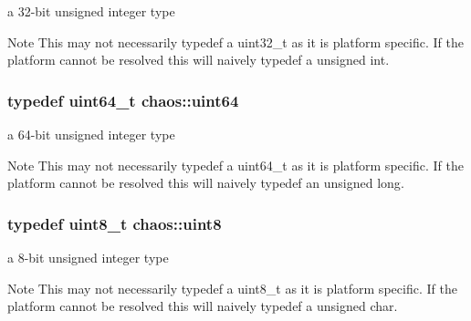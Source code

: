 a 32-\/bit unsigned integer type 

\begin{DoxyNote}{Note}
This may not necessarily {\ttfamily typedef} a {\ttfamily uint32\+\_\+t} as it is platform specific. If the platform cannot be resolved this will naively {\ttfamily typedef} a {\ttfamily unsigned int}. 
\end{DoxyNote}
\hypertarget{namespacechaos_a34fe5f5bfc3ef6d80b5d094ed91b4d6e}{}
\subsubsection[{uint64}]{\setlength{\rightskip}{0pt plus 5cm}typedef uint64\+\_\+t {\bf chaos\+::uint64}}\label{namespacechaos_a34fe5f5bfc3ef6d80b5d094ed91b4d6e}


a 64-\/bit unsigned integer type 

\begin{DoxyNote}{Note}
This may not necessarily {\ttfamily typedef} a {\ttfamily uint64\+\_\+t} as it is platform specific. If the platform cannot be resolved this will naively {\ttfamily typedef} an {\ttfamily unsigned long}. 
\end{DoxyNote}
\hypertarget{namespacechaos_a229e18634387996c2712d57f184bf363}{}
\subsubsection[{uint8}]{\setlength{\rightskip}{0pt plus 5cm}typedef uint8\+\_\+t {\bf chaos\+::uint8}}\label{namespacechaos_a229e18634387996c2712d57f184bf363}


a 8-\/bit unsigned integer type 

\begin{DoxyNote}{Note}
This may not necessarily {\ttfamily typedef} a {\ttfamily uint8\+\_\+t} as it is platform specific. If the platform cannot be resolved this will naively {\ttfamily typedef} a {\ttfamily unsigned char}. 
\end{DoxyNote}
